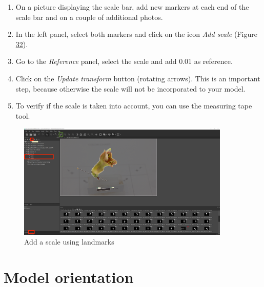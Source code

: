 \documentclass[
]{book}
\begin{document}
\begin{enumerate}
\def\labelenumi{\arabic{enumi}.}
\item
  On a picture displaying the scale bar, add new markers at each end
  of the scale bar and on a couple of additional photos.
\item
  In the left panel, select both markers and click on the icon \emph{Add
  scale} (Figure \protect\hyperlink{metashape_scale}{32}).
\item
  Go to the \emph{Reference} panel, select the scale and add 0.01 as
  reference.
\item
  Click on the \emph{Update transform} button (rotating arrows). This is an
  important step, because otherwise the scale will not be incorporated
  to your model.
\item
  To verify if the scale is taken into account, you can use the
  measuring tape tool.
\end{enumerate}

\begin{figure}
\hypertarget{metashape_scale}{%
\centering
\includegraphics[width=0.9\textwidth,height=\textheight]{Figures/metashape_add_scale_2.png}
\caption{Add a scale using
landmarks}\label{metashape_scale}
}
\end{figure}

\hypertarget{model-orientation}{%
\section{Model orientation}\label{model-orientation}}
\end{document}
